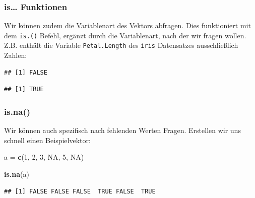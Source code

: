 \documentclass[
]{book}
\newenvironment{Shaded}{\begin{snugshade}}{\end{snugshade}}
\newcommand{\ConstantTok}[1]{\textcolor[rgb]{0.56,0.35,0.01}{#1}}
\newcommand{\DecValTok}[1]{\textcolor[rgb]{0.00,0.00,0.81}{#1}}
\newcommand{\FunctionTok}[1]{\textcolor[rgb]{0.13,0.29,0.53}{\textbf{#1}}}
\newcommand{\NormalTok}[1]{#1}
\newcommand{\OtherTok}[1]{\textcolor[rgb]{0.56,0.35,0.01}{#1}}
\newcommand{\SpecialCharTok}[1]{\textcolor[rgb]{0.81,0.36,0.00}{\textbf{#1}}}
\begin{document}
\subsubsection{is\ldots{} Funktionen}\label{is-funktionen}

Wir können zudem die Variablenart des Vektors abfragen. Dies funktioniert mit dem \texttt{is.()} Befehl, ergänzt durch die Variablenart, nach der wir fragen wollen. Z.B. enthält die Variable \texttt{Petal.Length} des \texttt{iris} Datensatzes ausschließlich Zahlen:

\begin{Shaded}
\end{Shaded}

\begin{verbatim}
## [1] FALSE
\end{verbatim}

\begin{Shaded}
\end{Shaded}

\begin{verbatim}
## [1] TRUE
\end{verbatim}

\subsubsection{is.na()}\label{is.na}

Wir können auch spezifisch nach fehlenden Werten Fragen. Erstellen wir uns schnell einen Beispielvektor:

\begin{Shaded}
\begin{Highlighting}[]
\NormalTok{a }\OtherTok{=} \FunctionTok{c}\NormalTok{(}\DecValTok{1}\NormalTok{, }\DecValTok{2}\NormalTok{, }\DecValTok{3}\NormalTok{, }\ConstantTok{NA}\NormalTok{, }\DecValTok{5}\NormalTok{, }\ConstantTok{NA}\NormalTok{)}

\FunctionTok{is.na}\NormalTok{(a)}
\end{Highlighting}
\end{Shaded}

\begin{verbatim}
## [1] FALSE FALSE FALSE  TRUE FALSE  TRUE
\end{verbatim}
\end{document}
